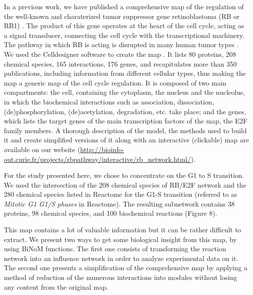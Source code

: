 \documentclass[10pt]{bmc_article}
\newenvironment{bmcformat}{\baselineskip20pt\sloppy\setboolean{publ}{false}}{\baselineskip20pt\sloppy}
\begin{document}
\begin{bmcformat}
In a previous work, we have published a comprehensive map of the regulation of the well-known and charaterized tumor
suppressor gene retinoblastoma (RB or RB1) \cite{calzone2008comprehensive}. The product of this gene operates at
the heart of the cell cycle, acting as a signal transducer, connecting the
cell cycle with the transcriptional machinery. The pathway in which RB is
acting is disrupted in many human tumor types \cite{weinberg1995retinoblastoma}.
We used the Celldesigner software to create the map \cite{funahashi2003celldesigner}. It lists 80 proteins, 208 chemical species, 165
interactions, 176 genes, and recapitulates more than 350 publications, including
information from different cellular types, thus making the map a generic map of
the cell cycle regulation. It is composed of two main compartments: the cell,
containing the cytoplasm, the nucleus and the nucleolus, in which the
biochemical interactions such as association, dissociation, (de)phosphorylation,
(de)acetylation, degradation, etc. take place; and the genes, which lists the
target genes of the main transcription factors of the map, the E2F family
members.
A thorough description of the model, the methods used to build it and create
simplified versions of it along with an interactive (clickable) map are
available on our website
(\url{http://bioinfo-out.curie.fr/projects/rbpathway/interactive/rb_network.html/}).

For the study presented here, we chose to concentrate on the G1 to S transition. We
used the intersection of the 208 chemical species
of RB/E2F network and the 280 chemical species listed in Reactome \cite{joshi2005reactome} for the G1-S transition
(referred to as \emph{Mitotic G1 G1/S phases} in Reactome). The resulting
subnetwork contains 38 proteins, 98 chemical species, and 100 biochemical
reactions (Figure 8).


This map contains a lot of valuable information but it can be rather difficult to extract. We present two
ways to get some biological insight from this map, by using BiNoM functions. The first one consists of
transforming the reaction network into an influence network in order to analyze
experimental data on it. The second one presents a simplification of the comprehensive map by
applying a method of reduction of the numerous interactions into modules without
losing any content from the original map.


\end{bmcformat}
\end{document}
